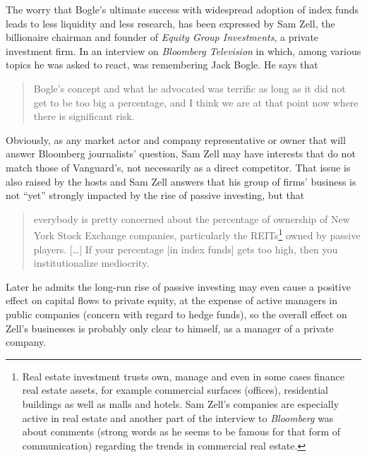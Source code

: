 The worry that Bogle's ultimate success with widespread adoption of index funds leads to less liquidity and less research, has been expressed by Sam Zell, the billionaire chairman and founder of \textit{Equity Group Investments}, a private investment firm. In an interview on \textit{Bloomberg Television} in which, among various topics he was asked to react, was remembering Jack Bogle. He says that
\begin{quotation}
Bogle's concept and what he advocated was terrific as long as it did not get to be too big a percentage, and I think we are at that point now where there is significant risk.
\end{quotation}
Obviously, as any market actor and company representative or owner that will answer Bloomberg journalists' question, Sam Zell may have interests that do not match those of Vanguard's, not necessarily as a direct competitor. That issue is also raised by the hosts and Sam Zell answers that his group of firms' business is not ``yet'' strongly impacted by the rise of passive investing, but that
\begin{quotation}
everybody is pretty concerned about the percentage of ownership of New York Stock Exchange companies, particularly the REITs\footnote{Real estate investment trusts own, manage and even in some cases finance real estate assets, for example commercial surfaces (offices), residential buildings as well as malls and hotels. Sam Zell's companies are especially active in real estate and another part of the interview to \textit{Bloomberg} was about comments (strong words as he seems to be famous for that form of communication) regarding the trends in commercial real estate.} owned by passive players. [\ldots] If your percentage [in index funds] gets too high, then you institutionalize mediocrity.
\end{quotation}
Later he admits the long-run rise of passive investing may even cause a positive effect on capital flows to private equity, at the expense of active managers in public companies (concern with regard to hedge funds), so the overall effect on Zell's businesses is probably only clear to himself, as a manager of a private company.

